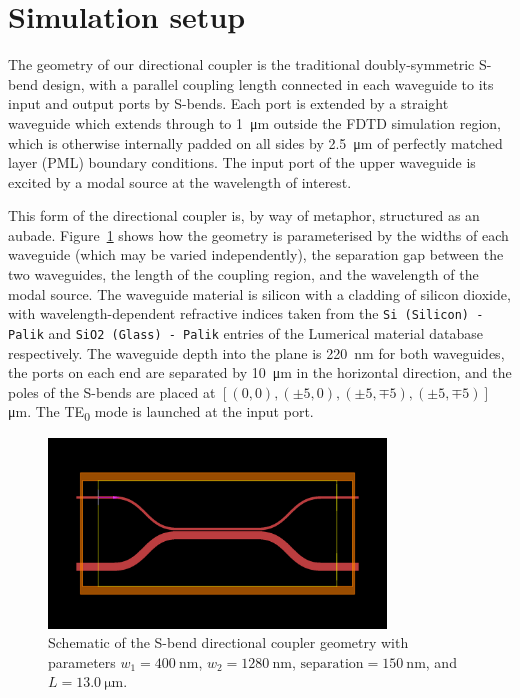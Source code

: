 \documentclass[10pt, a4paper]{article}
\begin{document}
\section{Simulation setup}

The geometry of our directional coupler is the traditional doubly-symmetric S-bend design,
with a parallel coupling length connected in each waveguide to its input and output ports by S-bends.
Each port is extended by a straight waveguide which extends through to \SI{1}{\um} outside the FDTD simulation region,
which is otherwise internally padded on all sides by \SI{2.5}{\um} of perfectly matched layer (PML) boundary conditions.
The input port of the upper waveguide is excited by a modal source at the wavelength of interest.

This form of the directional coupler is, by way of metaphor, structured as an aubade.
Figure~\ref{fig:s_bend_coupler} shows how the geometry is parameterised by the widths of each waveguide (which may be varied independently),
the separation gap between the two waveguides, the length of the coupling region,
and the wavelength of the modal source.
The waveguide material is silicon with a cladding of silicon dioxide,
with wavelength-dependent refractive indices taken from the \texttt{Si (Silicon) - Palik}
and \texttt{SiO2 (Glass) - Palik} entries of the Lumerical material database respectively.
The waveguide depth into the plane is \SI{220}{\nm} for both waveguides,
the ports on each end are separated by \SI{10}{\um} in the horizontal direction,
and the poles of the S-bends are placed at \([(0,0), (\pm 5, 0), (\pm 5, \mp 5), (\pm 5, \mp 5)]\)\,\unit{\um}.
The TE\textsubscript{0} mode is launched at the input port.

\begin{figure}[h!]
  \centering
  \includegraphics[width=0.8\textwidth]{task3/views/wg1_width=0.4_wg2_width=1.28_separation=0.15_coupling_length=13.0.png}
  \caption{Schematic of the S-bend directional coupler geometry
  with parameters \(w_1=\SI{400}{\nm}\), \(w_2=\SI{1280}{\nm}\), \(\text{separation}=\SI{150}{\nm}\), and \(L=\SI{13.0}{\um}\).}
  \label{fig:s_bend_coupler}
\end{figure}
\end{document}
